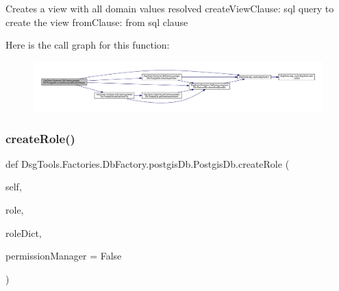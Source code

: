 \begin{DoxyVerb}Creates a view with all domain values resolved
createViewClause: sql query to create the view
fromClause: from sql clause
\end{DoxyVerb}
 Here is the call graph for this function\+:
\nopagebreak
\begin{figure}[H]
\begin{center}
\leavevmode
\includegraphics[width=350pt]{class_dsg_tools_1_1_factories_1_1_db_factory_1_1postgis_db_1_1_postgis_db_a7bd306d8b623d73e99e15206c8d64a48_cgraph}
\end{center}
\end{figure}
\mbox{\label{class_dsg_tools_1_1_factories_1_1_db_factory_1_1postgis_db_1_1_postgis_db_ace547927f57afe2b2aaf26b122fea42c}} 
\subsubsection{\texorpdfstring{create\+Role()}{createRole()}}
{\footnotesize\ttfamily def Dsg\+Tools.\+Factories.\+Db\+Factory.\+postgis\+Db.\+Postgis\+Db.\+create\+Role (\begin{DoxyParamCaption}\item[{}]{self,  }\item[{}]{role,  }\item[{}]{role\+Dict,  }\item[{}]{permission\+Manager = {\ttfamily False} }\end{DoxyParamCaption})}

